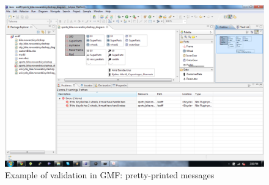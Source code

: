 \begin{figure}[H]
    \begin{center}
        \includegraphics[width=\textwidth]{fig/gmf/validation/validation_example.pdf}
        \caption{Example of validation in GMF: pretty-printed messages}
        \label{fig.gmf_validation}
    \end{center}
\end{figure}
